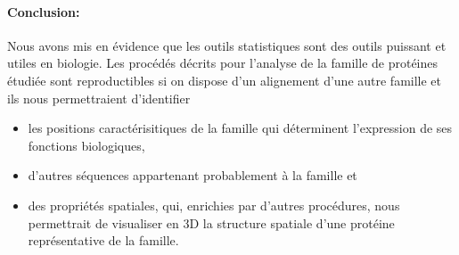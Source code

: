 \documentclass[a4paper, french]{article}
\begin{document}
\paragraph{Conclusion:}
Nous avons mis en \'evidence que les outils statistiques sont des outils
puissant et utiles en biologie. Les proc\'ed\'es d\'ecrits pour
l'analyse de la famille de prot\'eines \'etudi\'ee sont reproductibles si
on dispose d'un alignement d'une autre famille et ils nous permettraient
d'identifier
\vskip 1mm
\begin{itemize}
    \item les positions caract\'erisitiques de la famille qui d\'eterminent
        l'expression de ses fonctions biologiques,
        \vskip 1mm
    \item d'autres s\'equences appartenant probablement \`a la famille et
        \vskip 1mm
    \item des propri\'et\'es spatiales, qui, enrichies par d'autres
        proc\'edures, nous permettrait de
        visualiser en 3D la structure spatiale d'une prot\'eine
        repr\'esentative de la famille.
\end{itemize}
\end{document}
